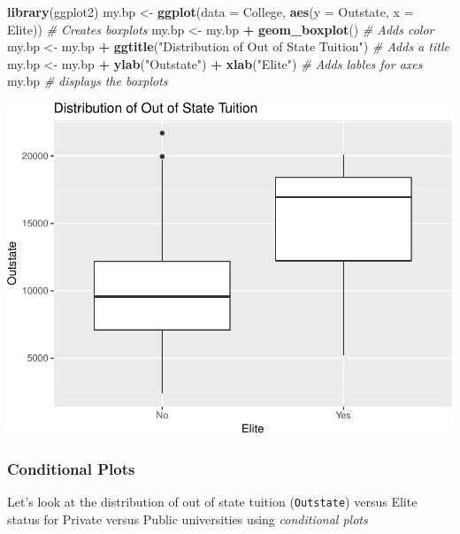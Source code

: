 \documentclass[]{article}
\newenvironment{Shaded}{\begin{snugshade}}{\end{snugshade}}
\newcommand{\KeywordTok}[1]{\textcolor[rgb]{0.13,0.29,0.53}{\textbf{#1}}}
\newcommand{\DataTypeTok}[1]{\textcolor[rgb]{0.13,0.29,0.53}{#1}}
\newcommand{\StringTok}[1]{\textcolor[rgb]{0.31,0.60,0.02}{#1}}
\newcommand{\CommentTok}[1]{\textcolor[rgb]{0.56,0.35,0.01}{\textit{#1}}}
\newcommand{\OperatorTok}[1]{\textcolor[rgb]{0.81,0.36,0.00}{\textbf{#1}}}
\newcommand{\NormalTok}[1]{#1}
\begin{document}
\begin{Shaded}
\begin{Highlighting}[]
\KeywordTok{library}\NormalTok{(ggplot2)}
\NormalTok{my.bp <-}\StringTok{ }\KeywordTok{ggplot}\NormalTok{(}\DataTypeTok{data =}\NormalTok{ College, }\KeywordTok{aes}\NormalTok{(}\DataTypeTok{y =}\NormalTok{ Outstate, }\DataTypeTok{x =}\NormalTok{ Elite)) }\CommentTok{# Creates boxplots}
\NormalTok{my.bp <-}\StringTok{ }\NormalTok{my.bp }\OperatorTok{+}\StringTok{ }\KeywordTok{geom_boxplot}\NormalTok{() }\CommentTok{# Adds color}
\NormalTok{my.bp <-}\StringTok{ }\NormalTok{my.bp }\OperatorTok{+}\StringTok{ }\KeywordTok{ggtitle}\NormalTok{(}\StringTok{"Distribution of Out of State Tuition"}\NormalTok{) }\CommentTok{# Adds a title}
\NormalTok{my.bp <-}\StringTok{ }\NormalTok{my.bp }\OperatorTok{+}\StringTok{  }\KeywordTok{ylab}\NormalTok{(}\StringTok{"Outstate"}\NormalTok{) }\OperatorTok{+}\StringTok{ }\KeywordTok{xlab}\NormalTok{(}\StringTok{"Elite"}\NormalTok{) }\CommentTok{# Adds lables for axes}
\NormalTok{my.bp }\CommentTok{# displays the boxplots}
\end{Highlighting}
\end{Shaded}

\includegraphics{Lab1Q_files/figure-latex/unnamed-chunk-10-1.pdf}

\subsubsection{Conditional Plots}\label{conditional-plots}

Let's look at the distribution of out of state tuition
(\texttt{Outstate}) versus Elite status for Private versus Public
universities using \emph{conditional plots}
\end{document}
